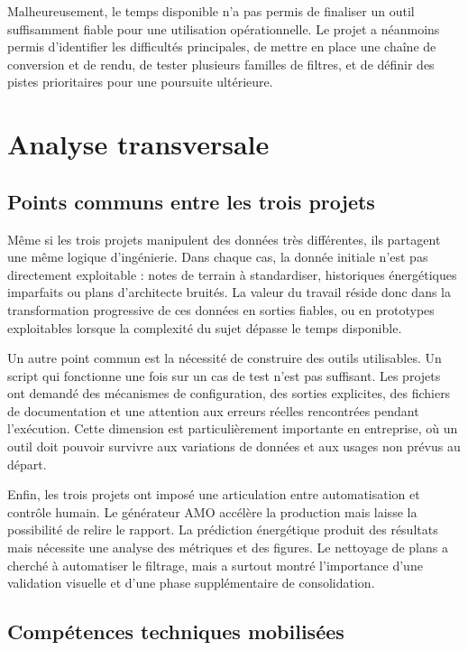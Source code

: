 \documentclass[12pt]{article}
\begin{document}
Malheureusement, le temps disponible n’a pas permis de finaliser un outil suffisamment fiable pour une utilisation opérationnelle. Le projet a néanmoins permis d’identifier les difficultés principales, de mettre en place une chaîne de conversion et de rendu, de tester plusieurs familles de filtres, et de définir des pistes prioritaires pour une poursuite ultérieure. 

\newpage
\section{Analyse transversale}

\subsection{Points communs entre les trois projets}

Même si les trois projets manipulent des données très différentes, ils partagent une même logique d’ingénierie. Dans chaque cas, la donnée initiale n’est pas directement exploitable : notes de terrain à standardiser, historiques énergétiques imparfaits ou plans d’architecte bruités. La valeur du travail réside donc dans la transformation progressive de ces données en sorties fiables, ou en prototypes exploitables lorsque la complexité du sujet dépasse le temps disponible. 

Un autre point commun est la nécessité de construire des outils utilisables. Un script qui fonctionne une fois sur un cas de test n’est pas suffisant. Les projets ont demandé des mécanismes de configuration, des sorties explicites, des fichiers de documentation et une attention aux erreurs réelles rencontrées pendant l’exécution. Cette dimension est particulièrement importante en entreprise, où un outil doit pouvoir survivre aux variations de données et aux usages non prévus au départ. 

Enfin, les trois projets ont imposé une articulation entre automatisation et contrôle humain. Le générateur AMO accélère la production mais laisse la possibilité de relire le rapport. La prédiction énergétique produit des résultats mais nécessite une analyse des métriques et des figures. Le nettoyage de plans a cherché à automatiser le filtrage, mais a surtout montré l’importance d’une validation visuelle et d’une phase supplémentaire de consolidation. 

\subsection{Compétences techniques mobilisées}
\end{document}
